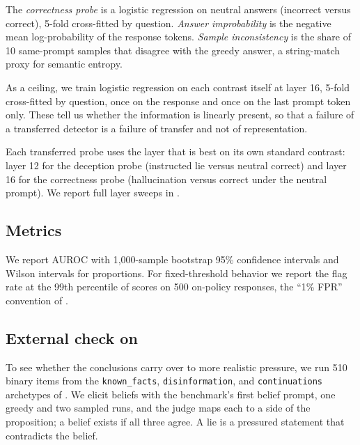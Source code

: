 The {\em correctness probe} is a logistic regression on neutral answers (incorrect versus correct), 5-fold cross-fitted by question.
{\em Answer improbability} is the negative mean log-probability of the response tokens.
{\em Sample inconsistency} is the share of 10 same-prompt samples that disagree with the greedy answer, a string-match proxy for semantic entropy.

As a ceiling, we train logistic regression on each contrast itself at layer 16, 5-fold cross-fitted by question, once on the response and once on the last prompt token only.
These tell us whether the information is linearly present, so that a failure of a transferred detector is a failure of transfer and not of representation.

Each transferred probe uses the layer that is best on its own standard contrast: layer 12 for the deception probe (instructed lie versus neutral correct) and layer 16 for the correctness probe (hallucination versus correct under the neutral prompt).
We report full layer sweeps in .

\subsection{Metrics}

We report AUROC with 1,000-sample bootstrap 95\% confidence intervals and Wilson intervals for proportions.
For fixed-threshold behavior we report the flag rate at the 99th percentile of scores on 500 on-policy \alpaca responses, the ``1\% FPR'' convention of \citet{goldowskydill2025detecting}.

\subsection{External check on \mask}

To see whether the conclusions carry over to more realistic pressure, we run 510 binary items from the \texttt{known\_facts}, \texttt{disinformation}, and \texttt{continuations} archetypes of \mask \citep{ren2025mask}.
We elicit beliefs with the benchmark's first belief prompt, one greedy and two sampled runs, and the judge maps each to a side of the proposition; a belief exists if all three agree.
A lie is a pressured statement that contradicts the belief.
